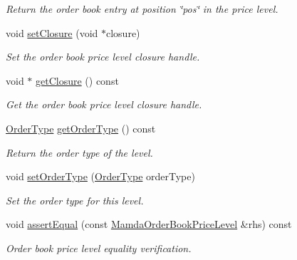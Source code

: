 \begin{CompactItemize}
\begin{CompactList}\small\item\em Return the order book entry at position \char`\"{}pos\char`\"{} in the price level. \item\end{CompactList}\item 
void \hyperlink{classWombat_1_1MamdaOrderBookPriceLevel_50ba53496b7d105de413bafeaf4ec1b1}{set\-Closure} (void $\ast$closure)
\begin{CompactList}\small\item\em Set the order book price level closure handle. \item\end{CompactList}\item 
void $\ast$ \hyperlink{classWombat_1_1MamdaOrderBookPriceLevel_66f596682605b9c643eb8e3a68043621}{get\-Closure} () const 
\begin{CompactList}\small\item\em Get the order book price level closure handle. \item\end{CompactList}\item 
\hyperlink{classWombat_1_1MamdaOrderBookPriceLevel_7c24238cb240e1d2d86aaa414198c996}{Order\-Type} \hyperlink{classWombat_1_1MamdaOrderBookPriceLevel_48b2487d645a512f016205f411337edc}{get\-Order\-Type} () const 
\begin{CompactList}\small\item\em Return the order type of the level. \item\end{CompactList}\item 
void \hyperlink{classWombat_1_1MamdaOrderBookPriceLevel_1a1ed16aa2b724cb8d6c857ac28239f3}{set\-Order\-Type} (\hyperlink{classWombat_1_1MamdaOrderBookPriceLevel_7c24238cb240e1d2d86aaa414198c996}{Order\-Type} order\-Type)
\begin{CompactList}\small\item\em Set the order type for this level. \item\end{CompactList}\item 
void \hyperlink{classWombat_1_1MamdaOrderBookPriceLevel_7a19253c0da8d8bd8139aeebc5c4a505}{assert\-Equal} (const \hyperlink{classWombat_1_1MamdaOrderBookPriceLevel}{Mamda\-Order\-Book\-Price\-Level} \&rhs) const 
\begin{CompactList}\small\item\em Order book price level equality verification. \item\end{CompactList}\item 

\end{CompactItemize}
